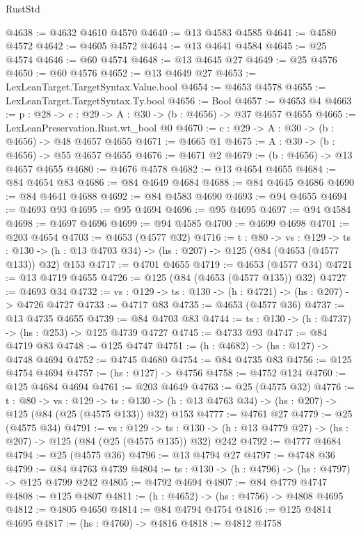 \begin{lexlean}{RustStd}
\begin{coremodule}
{\begin{coremodule}
{{{{{{{{{{{{{{{@4638 := @4632 @4610 @4570
@4640 := @13 @4583 @4585
@4641 := @4580 @4572
@4642 := @4605 @4572
@4644 := @13 @4641 @4584
@4645 := @25 @4574
@4646 := @60 @4574
@4648 := @13 @4645 @27
@4649 := @25 @4576
@4650 := @60 @4576
@4652 := @13 @4649 @27
@4653 := LexLeanTarget.TargetSyntax.Value.bool
@4654 := @4653 @4578
@4655 := LexLeanTarget.TargetSyntax.Ty.bool
@4656 := Bool
@4657 := @4653 @4
@4663 := {p : @28} -> {c : @29} -> {A : @30} -> (b : @4656) -> @37 @4657 @4655
@4665 := LexLeanPreservation.Rust.wt_bool @0
@4670 := {c : @29} -> {A : @30} -> (b : @4656) -> @48 @4657 @4655
@4671 := @4665 @1
@4675 := {A : @30} -> (b : @4656) -> @55 @4657 @4655
@4676 := @4671 @2
@4679 := (b : @4656) -> @13 @4657 @4655
@4680 := @4676 @4578
@4682 := @13 @4654 @4655
@4684 := @84 @4654 @83
@4686 := @84 @4649 @4684
@4688 := @84 @4645 @4686
@4690 := @84 @4641 @4688
@4692 := @84 @4583 @4690
@4693 := @94 @4655
@4694 := @4693 @93
@4695 := @95 @4694
@4696 := @95 @4695
@4697 := @94 @4584
@4698 := @4697 @4696
@4699 := @94 @4585
@4700 := @4699 @4698
@4701 := @203 @4654
@4703 := @4653 (@4577 @32)
@4716 := {t : @80} ->
  {vs : @129} ->
  {ts : @130} -> (h : @13 @4703 @34) -> (hs : @207) -> @125 (@84 (@4653 (@4577 @133)) @32) @153
@4717 := @4701 @4655
@4719 := @4653 (@4577 @34)
@4721 := @13 @4719 @4655
@4726 := @125 (@84 (@4653 (@4577 @135)) @32)
@4727 := @4693 @34
@4732 := {vs : @129} -> {ts : @130} -> (h : @4721) -> (hs : @207) -> @4726 @4727
@4733 := @4717 @83
@4735 := @4653 (@4577 @36)
@4737 := @13 @4735 @4655
@4739 := @84 @4703 @83
@4744 := {ts : @130} -> (h : @4737) -> (hs : @253) -> @125 @4739 @4727
@4745 := @4733 @93
@4747 := @84 @4719 @83
@4748 := @125 @4747
@4751 := (h : @4682) -> (hs : @127) -> @4748 @4694
@4752 := @4745 @4680
@4754 := @84 @4735 @83
@4756 := @125 @4754 @4694
@4757 := (hs : @127) -> @4756
@4758 := @4752 @124
@4760 := @125 @4684 @4694
@4761 := @203 @4649
@4763 := @25 (@4575 @32)
@4776 := {t : @80} ->
  {vs : @129} ->
  {ts : @130} -> (h : @13 @4763 @34) -> (hs : @207) -> @125 (@84 (@25 (@4575 @133)) @32) @153
@4777 := @4761 @27
@4779 := @25 (@4575 @34)
@4791 := {vs : @129} ->
  {ts : @130} -> (h : @13 @4779 @27) -> (hs : @207) -> @125 (@84 (@25 (@4575 @135)) @32) @242
@4792 := @4777 @4684
@4794 := @25 (@4575 @36)
@4796 := @13 @4794 @27
@4797 := @4748 @36
@4799 := @84 @4763 @4739
@4804 := {ts : @130} -> (h : @4796) -> (hs : @4797) -> @125 @4799 @242
@4805 := @4792 @4694
@4807 := @84 @4779 @4747
@4808 := @125 @4807
@4811 := (h : @4652) -> (hs : @4756) -> @4808 @4695
@4812 := @4805 @4650
@4814 := @84 @4794 @4754
@4816 := @125 @4814 @4695
@4817 := (hs : @4760) -> @4816
@4818 := @4812 @4758
}}}}}}}}}}}}}}}
\end{coremodule}}
\end{coremodule}
\end{lexlean}
